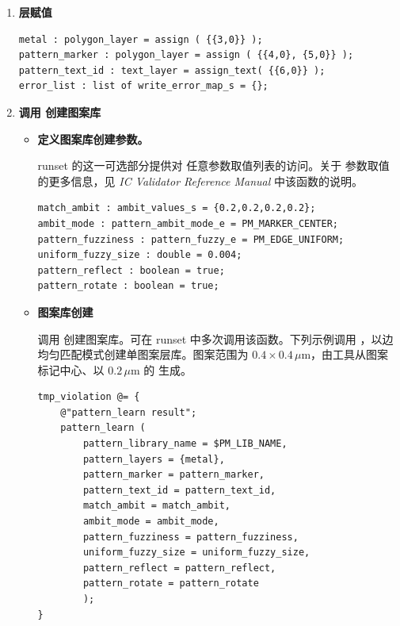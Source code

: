 \begin{enumerate}
\begin{noteBox}
 参数指定的图案库路径必须在图案库创建之前已存在，否则会发生运行时错误。
\end{noteBox}

  \item \textbf{层赋值}
\begin{lstlisting}[style=pxl]
metal : polygon_layer = assign ( {{3,0}} );
pattern_marker : polygon_layer = assign ( {{4,0}, {5,0}} );
pattern_text_id : text_layer = assign_text( {{6,0}} );
error_list : list of write_error_map_s = {};
\end{lstlisting}

  \item \textbf{调用  创建图案库}
  \begin{itemize}
    \item \textbf{定义图案库创建参数。}

    runset 的这一可选部分提供对  任意参数取值列表的访问。关于  参数取值的更多信息，见 \textit{IC Validator Reference Manual} 中该函数的说明。
\begin{lstlisting}[style=pxl]
match_ambit : ambit_values_s = {0.2,0.2,0.2,0.2};
ambit_mode : pattern_ambit_mode_e = PM_MARKER_CENTER;
pattern_fuzziness : pattern_fuzzy_e = PM_EDGE_UNIFORM;
uniform_fuzzy_size : double = 0.004;
pattern_reflect : boolean = true;
pattern_rotate : boolean = true;
\end{lstlisting}

    \item \textbf{图案库创建}

    调用  创建图案库。可在 runset 中多次调用该函数。下列示例调用 ，以边均匀匹配模式创建单图案层库。图案范围为 $0.4 \times 0.4\,\mu\mathrm{m}$，由工具从图案标记中心、以 $0.2\,\mu\mathrm{m}$ 的  生成。
\begin{lstlisting}[style=pxl]
tmp_violation @= {
    @"pattern_learn result";
    pattern_learn (
        pattern_library_name = $PM_LIB_NAME,
        pattern_layers = {metal},
        pattern_marker = pattern_marker,
        pattern_text_id = pattern_text_id,
        match_ambit = match_ambit,
        ambit_mode = ambit_mode,
        pattern_fuzziness = pattern_fuzziness,
        uniform_fuzzy_size = uniform_fuzzy_size,
        pattern_reflect = pattern_reflect,
        pattern_rotate = pattern_rotate
        );
}
\end{lstlisting}


\end{itemize}
\end{enumerate}
